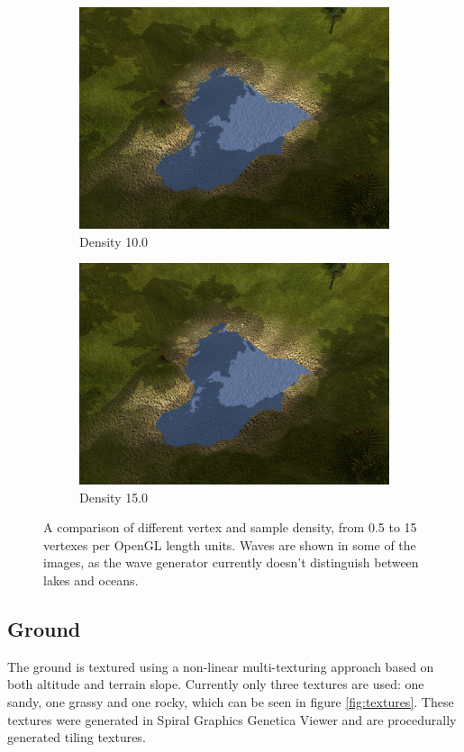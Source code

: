 \begin{figure}[H]
\begin{subfigure}{.5\textwidth}
  \centering
  \includegraphics[width=0.9\linewidth]{images/terrainDensityComparison1_10.jpg}
  \caption{Density 10.0}
  \label{fig:textureDensity10}
\end{subfigure}%
\begin{subfigure}{.5\textwidth}
  \centering
  \includegraphics[width=0.9\linewidth]{images/terrainDensityComparison1_15.jpg}
  \caption{Density 15.0}
  \label{fig:textureDensity15}
\end{subfigure}%
  \caption{A comparison of different vertex and sample density, from 0.5 to 15 vertexes per OpenGL length units. Waves are shown in some of the images, as the wave generator currently doesn't distinguish between lakes and oceans.}
  \label{fig:textureDensityComparison1}
\end{figure}

\newpage
\subsection{Ground}
The ground is textured using a non-linear multi-texturing approach based on both altitude and terrain slope. Currently only three textures are used: one sandy, one grassy and one rocky, which can be seen in figure \ref{fig:textures}. These textures were generated in Spiral Graphics Genetica Viewer and are procedurally generated tiling textures.

